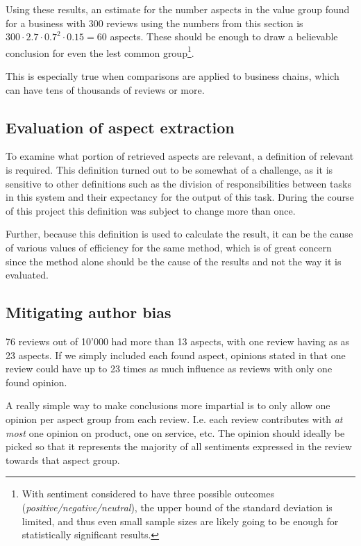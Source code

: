 \documentclass[a4paper,11pt]{kth-mag}
\newcommand{\numValueAspects}{60}
\begin{document}
Using these results, an estimate for the number aspects in the value group found for a business
with 300 reviews using the numbers from this section is $300 \cdot 2.7 \cdot 0.7^2 \cdot 0.15 =
\numValueAspects $ aspects.
These should be enough to draw a believable conclusion for even the lest common group\footnote{With sentiment considered to have three possible outcomes (\emph{positive/negative/neutral}), the upper bound of the standard deviation is limited, and thus even small sample sizes are likely going to be enough for statistically significant results.}.

This is especially true when comparisons are applied to business chains, which can have
tens of thousands of reviews or more.


\subsection{Evaluation of aspect extraction}
\label{subsec:aspect_eval}
To examine what portion of retrieved aspects are relevant, a definition of relevant
is required. This definition turned out to be somewhat of a challenge, as it is sensitive
to other definitions such as the division of responsibilities between tasks
in this system and their expectancy for the output of this task.
During the course of this project this definition was subject to change more than once.

Further, because this definition is used to calculate the result, it can be the cause of
various values of efficiency for the same method, which is of great concern
since the method alone should be the cause of the results and not the way it is evaluated.


\subsection{Mitigating author bias}
76 reviews out of 10'000 had more than 13 aspects, with one review having as  as 23 aspects.
If we simply included each found aspect, opinions stated in that one review could have up to
23 times as much influence as reviews with only one found opinion.

A really simple way to make conclusions more impartial is to only allow one
opinion per aspect group from each review.
I.e. each review contributes with \emph{at most} one opinion on product, one on service, etc.
The opinion should ideally be picked so that it represents the majority of
all sentiments expressed in the review towards that aspect group.
\end{document}
